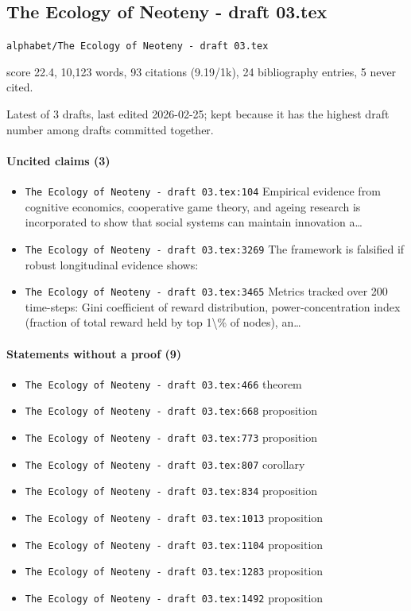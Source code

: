 \documentclass[11pt]{article}
\newcommand{\loc}[1]{{\small\color{muted}\texttt{#1}}}
\begin{document}
\subsection{The Ecology of Neoteny - draft 03.tex}
\loc{alphabet/\allowbreak{}The Ecology of Neoteny - draft 03.tex}\par
score 22.4, 10,123 words, 93 citations (9.19/1k), 24 bibliography entries, 5 never cited.

Latest of 3 drafts, last edited 2026-02-25; kept because it has the highest draft number among drafts committed together.

\paragraph{Uncited claims (3)}
\begin{itemize}
\item \loc{The Ecology of Neoteny - draft 03.tex:104} Empirical evidence from cognitive economics, cooperative game theory, and ageing research is incorporated to show that social systems can maintain innovation a\ldots{}
\item \loc{The Ecology of Neoteny - draft 03.tex:3269} The framework is falsified if robust longitudinal evidence shows:
\item \loc{The Ecology of Neoteny - draft 03.tex:3465} Metrics tracked over 200 time-steps: Gini coefficient of reward distribution, power-concentration index (fraction of total reward held by top 1\textbackslash{}\% of nodes), an\ldots{}
\end{itemize}
\paragraph{Statements without a proof (9)}
\begin{itemize}
\item \loc{The Ecology of Neoteny - draft 03.tex:466} theorem
\item \loc{The Ecology of Neoteny - draft 03.tex:668} proposition
\item \loc{The Ecology of Neoteny - draft 03.tex:773} proposition
\item \loc{The Ecology of Neoteny - draft 03.tex:807} corollary
\item \loc{The Ecology of Neoteny - draft 03.tex:834} proposition
\item \loc{The Ecology of Neoteny - draft 03.tex:1013} proposition
\item \loc{The Ecology of Neoteny - draft 03.tex:1104} proposition
\item \loc{The Ecology of Neoteny - draft 03.tex:1283} proposition
\item \loc{The Ecology of Neoteny - draft 03.tex:1492} proposition
\end{itemize}
\end{document}
